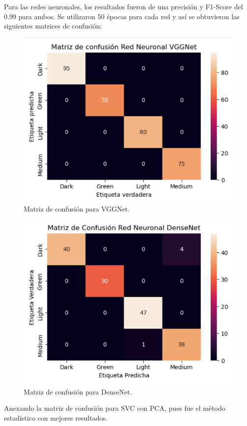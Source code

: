 \documentclass[twocolumn]{article}
\begin{document}
Para las redes neuronales, los resultados fueron de una precisión y F1-Score del 0.99 para ambos. Se utilizaron 50 épocas para cada red y así se obtuvieron las siguientes matrices de confusión:
\begin{figure}[H] 
  \centering
  \includegraphics[width=0.8\columnwidth]{VGGNet.png} 
  \caption{Matriz de confusión para VGGNet.}
  \label{fig:Pvgg} 
\end{figure}
\vspace{-10pt}
\begin{figure}[H] 
  \centering
  \includegraphics[width=0.8\columnwidth]{DenseNet.png} 
  \caption{Matriz de confusión para DenseNet.}
  \label{fig:PDN} 
\end{figure}
\vspace{-10pt}
Anexando la matriz de confusión para SVC con PCA, pues fue el método estadístico con mejores resultados.
\end{document}
